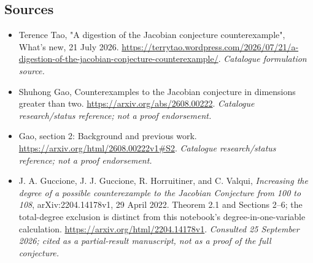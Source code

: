 \documentclass[11pt]{article}
\begin{document}
\subsection{Sources}
\begin{itemize}\raggedright
\item[\textnormal{[S1]}]\hypertarget{source:103:1}{} Terence Tao, "A digestion of the Jacobian conjecture counterexample", What's new, 21 July 2026.
\url{https://terrytao.wordpress.com/2026/07/21/a-digestion-of-the-jacobian-conjecture-counterexample/}.
{\small\textit{Catalogue formulation source.}}
\item[\textnormal{[S2]}]\hypertarget{source:103:2}{} Shuhong Gao, Counterexamples to the Jacobian conjecture in dimensions greater than two.
\url{https://arxiv.org/abs/2608.00222}.
{\small\textit{Catalogue research/status reference; not a proof endorsement.}}
\item[\textnormal{[S3]}]\hypertarget{source:103:3}{} Gao, section 2: Background and previous work.
\url{https://arxiv.org/html/2608.00222v1#S2}.
{\small\textit{Catalogue research/status reference; not a proof endorsement.}}
\item[\textnormal{[E1]}]\hypertarget{extra:103:1}{}
J. A. Guccione, J. J. Guccione, R. Horruitiner, and C. Valqui,
\emph{Increasing the degree of a possible counterexample to the Jacobian
Conjecture from 100 to 108}, arXiv:2204.14178v1, 29 April 2022.
Theorem 2.1 and Sections 2--6; the total-degree exclusion is distinct from
this notebook's degree-in-one-variable calculation.
\url{https://arxiv.org/html/2204.14178v1}.
{\small\textit{Consulted 25 September 2026; cited as a partial-result
manuscript, not as a proof of the full conjecture.}}
\end{itemize}
\end{document}
